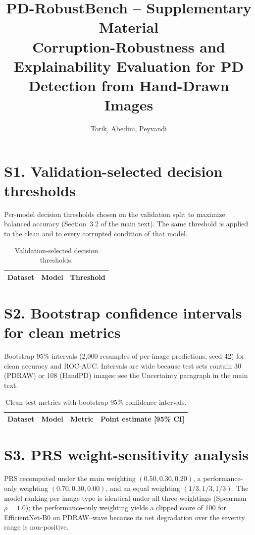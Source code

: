 \documentclass[11pt,a4paper]{article}
\title{\textbf{PD-RobustBench -- Supplementary Material}\\
\large Corruption-Robustness and Explainability Evaluation for
PD Detection from Hand-Drawn Images}
\author{Torik, Abedini, Peyvandi}
\date{}
\begin{document}
\maketitle

\section*{S1. Validation-selected decision thresholds}
Per-model decision thresholds chosen on the validation split to maximize
balanced accuracy (Section~3.2 of the main text). The same threshold is
applied to the clean and to every corrupted condition of that model.

\begin{table}[h]
\centering\small
\begin{tabular}{llc}
\toprule
Dataset & Model & Threshold \\
\midrule

\bottomrule
\end{tabular}
\caption{Validation-selected decision thresholds.}
\end{table}

\section*{S2. Bootstrap confidence intervals for clean metrics}
Bootstrap 95\% intervals (2{,}000 resamples of per-image predictions, seed 42)
for clean accuracy and ROC-AUC. Intervals are wide because test sets contain
30 (PDRAW) or 108 (HandPD) images; see the Uncertainty paragraph in the
main text.

\begin{table}[h]
\centering\small
\begin{tabular}{lllc}
\toprule
Dataset & Model & Metric & Point estimate [95\% CI] \\
\midrule

\bottomrule
\end{tabular}
\caption{Clean test metrics with bootstrap 95\% confidence intervals.}
\end{table}

\section*{S3. PRS weight-sensitivity analysis}
PRS recomputed under the main weighting $(0.50, 0.30, 0.20)$, a
performance-only weighting $(0.70, 0.30, 0.00)$, and an equal weighting
$(1/3, 1/3, 1/3)$. The model ranking per image type is identical under all
three weightings (Spearman $\rho = 1.0$); the performance-only weighting
yields a clipped score of 100 for EfficientNet-B0 on PDRAW--wave because its
net degradation over the severity range is non-positive.
\end{document}
